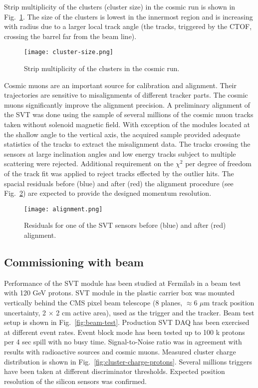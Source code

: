 Strip multiplicity of the clusters (cluster size) in the cosmic run is shown in Fig.~\ref{fig:cluster-size}. The size of the clusters is lowest in the innermost region and is increasing with radius due to a larger local track angle (the tracks, triggered by the CTOF, crossing the barrel far from the beam line).

\begin{figure}[hbt] 
\centering 
\texttt{[image: cluster-size.png]}
\caption{Strip multiplicity of the clusters in the cosmic run.}
\label{fig:cluster-size}
\end{figure}

Cosmic muons are an important source for calibration and alignment. Their trajectories are sensitive to misalignments of different tracker parts. The cosmic muons significantly improve the alignment precision. A preliminary alignment of the SVT was done using the sample of several millions of the cosmic muon tracks taken without solenoid magnetic field. With exception of the modules located at the shallow angle to the vertical axis, the acquired sample provided adequate statistics of the tracks to extract the misalignment data. The tracks crossing the sensors at large inclination angles and low energy tracks subject to multiple scattering were rejected. Additional requirement on the $\chi^2$ per degree of freedom of the track fit was applied to reject tracks effected by the outlier hits. The spacial residuals before (blue) and after (red) the alignment procedure (see Fig.~\ref{fig:alignment}) are expected to provide the designed momentum resolution.

\begin{figure}[hbt] 
\centering 
\texttt{[image: alignment.png]}
\caption{Residuals for one of the SVT sensors before (blue) and after (red) alignment.}
\label{fig:alignment}
\end{figure}

\subsection{Commissioning with beam}

Performance of the SVT module has been studied at Fermilab in a beam test with 120 GeV protons. SVT module in the plastic carrier box was mounted vertically behind the CMS pixel beam telescope (8 planes, $\approx$6 $\mu$m track position uncertainty, 2 $\times$ 2 cm active area), used as the trigger and the tracker. Beam test setup is shown in Fig.~\ref{fig:beam-test}. Production SVT DAQ has been exercised at different event rates. Event block mode has been tested up to 100 k protons per 4 sec spill with no busy time. Signal-to-Noise ratio was in agreement with results with radioactive sources and cosmic muons. Measured cluster charge distribution is shown in Fig.~\ref{fig:cluster-charge-protons}. Several millions triggers have been taken at different discriminator thresholds.  Expected position resolution of the silicon sensors was confirmed. 

